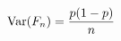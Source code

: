 \documentclass[preview]{standalone}
\begin{document}
\begin{align*}
\special{dvisvgm:raw <g id='unique000'>}\operatorname{Var}(F_n)=\frac{p(1-p)}n\special{dvisvgm:raw </g>}
\end{align*}
\end{document}
